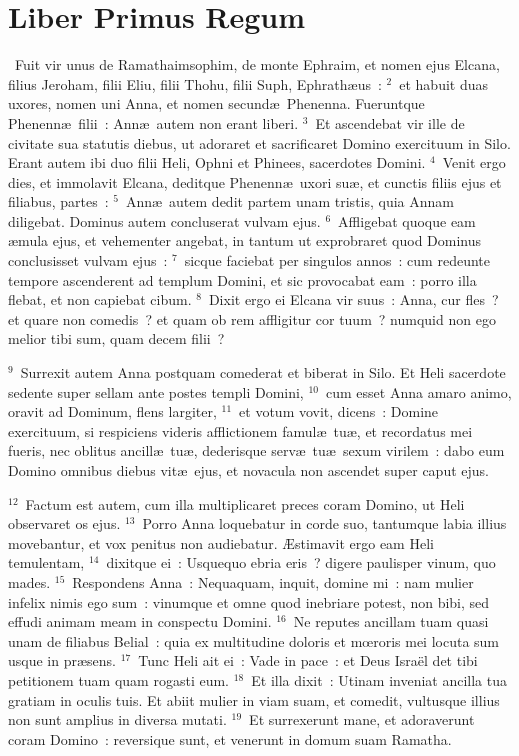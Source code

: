 \clearpage
{\centering \section*{Liber Primus Regum}}\thispagestyle{empty}

~Fuit vir unus de Ramathaimsophim, de monte Ephraim, et nomen ejus Elcana, filius Jeroham, filii Eliu, filii Thohu, filii Suph, Ephrath\ae us~:
${}^{2}$~et habuit duas uxores, nomen uni Anna, et nomen secund\ae\ Phenenna. Fueruntque Phenenn\ae\ filii~: Ann\ae\ autem non erant liberi.
${}^{3}$~Et ascendebat vir ille de civitate sua statutis diebus, ut adoraret et sacrificaret Domino exercituum in Silo. Erant autem ibi duo filii Heli, Ophni et Phinees, sacerdotes Domini.
${}^{4}$~Venit ergo dies, et immolavit Elcana, deditque Phenenn\ae\ uxori su\ae , et cunctis filiis ejus et filiabus, partes~:
${}^{5}$~Ann\ae\ autem dedit partem unam tristis, quia Annam diligebat. Dominus autem concluserat vulvam ejus.
${}^{6}$~Affligebat quoque eam \ae mula ejus, et vehementer angebat, in tantum ut exprobraret quod Dominus conclusisset vulvam ejus~:
${}^{7}$~sicque faciebat per singulos annos~: cum redeunte tempore ascenderent ad templum Domini, et sic provocabat eam~: porro illa flebat, et non capiebat cibum.
${}^{8}$~Dixit ergo ei Elcana vir suus~: Anna, cur fles~? et quare non comedis~? et quam ob rem affligitur cor tuum~? numquid non ego melior tibi sum, quam decem filii~?


${}^{9}$~Surrexit autem Anna postquam comederat et biberat in Silo. Et Heli sacerdote sedente super sellam ante postes templi Domini,
${}^{10}$~cum esset Anna amaro animo, oravit ad Dominum, flens largiter,
${}^{11}$~et votum vovit, dicens~: Domine exercituum, si respiciens videris afflictionem famul\ae\ tu\ae , et recordatus mei fueris, nec oblitus ancill\ae\ tu\ae , dederisque serv\ae\ tu\ae\ sexum virilem~: dabo eum Domino omnibus diebus vit\ae\ ejus, et novacula non ascendet super caput ejus.


${}^{12}$~Factum est autem, cum illa multiplicaret preces coram Domino, ut Heli observaret os ejus.
${}^{13}$~Porro Anna loquebatur in corde suo, tantumque labia illius movebantur, et vox penitus non audiebatur. \AE stimavit ergo eam Heli temulentam,
${}^{14}$~dixitque ei~: Usquequo ebria eris~? digere paulisper vinum, quo mades.
${}^{15}$~Respondens Anna~: Nequaquam, inquit, domine mi~: nam mulier infelix nimis ego sum~: vinumque et omne quod inebriare potest, non bibi, sed effudi animam meam in conspectu Domini.
${}^{16}$~Ne reputes ancillam tuam quasi unam de filiabus Belial~: quia ex multitudine doloris et mœroris mei locuta sum usque in pr\ae sens.
${}^{17}$~Tunc Heli ait ei~: Vade in pace~: et Deus Isra\"el det tibi petitionem tuam quam rogasti eum.
${}^{18}$~Et illa dixit~: Utinam inveniat ancilla tua gratiam in oculis tuis. Et abiit mulier in viam suam, et comedit, vultusque illius non sunt amplius in diversa mutati.
${}^{19}$~Et surrexerunt mane, et adoraverunt coram Domino~: reversique sunt, et venerunt in domum suam Ramatha.

